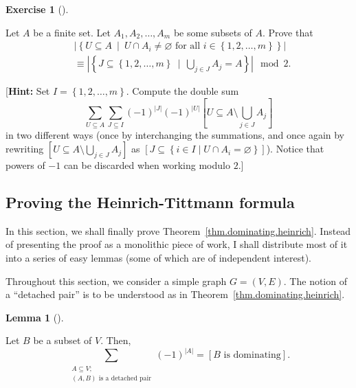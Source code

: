 \documentclass[numbers=enddot,12pt,final,onecolumn,notitlepage]{scrartcl}%
\theoremstyle{definition}
\newtheorem{lem}[theo]{Lemma}
\newenvironment{lemma}[1][]
{\begin{lem}[#1]\begin{leftbar}}
{\end{leftbar}\end{lem}}
\newtheorem{exmp}[theo]{Exercise}
\newenvironment{exercise}[1][]
{\begin{exmp}[#1]\begin{leftbar}}
{\end{leftbar}\end{exmp}}
\let\sumnonlimits\sum
\let\cupnonlimits\bigcup
\renewcommand{\sum}{\sumnonlimits\limits}
\renewcommand{\bigcup}{\cupnonlimits\limits}
\newcommand{\set}[1]{\left\{ #1 \right\}}
\newcommand{\abs}[1]{\left| #1 \right|}
\newcommand{\tup}[1]{\left( #1 \right)}
\newcommand{\ive}[1]{\left[ #1 \right]}
\begin{document}
\begin{exercise} \label{exe.dominating.heinrich-lemma-sum}
Let $A$ be a finite set. Let $A_1, A_2, \ldots, A_m$ be some subsets
of $A$. Prove that
\begin{align*}
& \abs{\set{U \subseteq A \ \mid \ U \cap A_i \neq \varnothing
          \text{ for all } i \in \set{1, 2, \ldots, m}}} \\
&\equiv
\abs{\set{J \subseteq \set{1, 2, \ldots, m} \ \mid
          \ \bigcup_{j \in J} A_j = A }}
\mod 2.
\end{align*}

[\textbf{Hint:} Set $I = \set{1, 2, \ldots, m}$. Compute the double
sum
\[
\sum_{U \subseteq A} \sum_{J \subseteq I}
\tup{-1}^{\abs{J}} \tup{-1}^{\abs{U}}
\ive{U \subseteq A \setminus \bigcup_{j \in J} A_j}
\]
in two different ways (once by interchanging the summations, and once
again by rewriting
$\ive{U \subseteq A \setminus \bigcup_{j \in J} A_j}$ as
$\ive{J \subseteq \set{i \in I \mid U \cap A_i = \varnothing}}$).
Notice that powers of $-1$ can be discarded when working
modulo $2$.]
\end{exercise}

\subsection{\label{subsect.dominating.lemmas}Proving
the Heinrich-Tittmann formula}

In this section, we shall finally prove
Theorem~\ref{thm.dominating.heinrich}. Instead of presenting the
proof as a monolithic piece of work, I shall distribute most of it
into a series of easy lemmas (some of which are of independent
interest).

Throughout this
section, we consider a simple graph $G = \tup{V, E}$. The notion of a
``detached pair'' is to be understood as in
Theorem~\ref{thm.dominating.heinrich}.

\begin{lemma} \label{lem.dominating.heinrich-lemma2}
Let $B$ be a subset of $V$. Then,
\[
\sum_{\substack{A \subseteq V; \\ \tup{A, B}
\text{ is a detached pair}}} \tup{-1}^{\abs{A}}
= \ive{B \text{ is dominating}}.
\]
\end{lemma}
\end{document}
